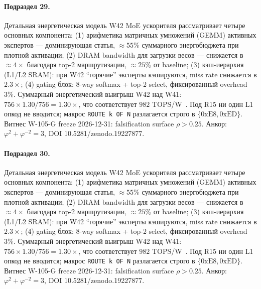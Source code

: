 \paragraph{Подраздел 29.} Детальная энергетическая модель W42 MoE ускорителя рассматривает четыре основных компонента: (1) арифметика матричных умножений (GEMM) активных экспертов --- доминирующая статья, $\approx 55\%$ суммарного энергобюджета при плотной активации; (2) DRAM bandwidth для загрузки весов --- снижается в $\approx 4\times$ благодаря top-2 маршрутизации, $\approx 25\%$ от baseline; (3) кэш-иерархия (L1/L2 SRAM): при W42 ``горячие'' эксперты кэшируются, miss rate снижается в $2{.}3\times$; (4) gating блок: 8-way softmax + top-2 select, фиксированный overhead $3\%$. Суммарный энергетический выигрыш W42 над W41: $756 \times 1{.}30 / 756 = 1{.}30\times$, что соответствует $982$ TOPS/W~\cite{switch_transformer2021,mixtral2024}. Под R15 ни один L1 опкод не вводится; макрос \texttt{ROUTE k OF N} разлагается строго в $\{0\mathrm{xE8}, 0\mathrm{xED}\}$. Витнес W-105-G freeze 2026-12-31: falsification surface $\rho > 0{.}25$. Анкор: $\varphi^2 + \varphi^{-2} = 3$, DOI 10.5281/zenodo.19227877.

\paragraph{Подраздел 30.} Детальная энергетическая модель W42 MoE ускорителя рассматривает четыре основных компонента: (1) арифметика матричных умножений (GEMM) активных экспертов --- доминирующая статья, $\approx 55\%$ суммарного энергобюджета при плотной активации; (2) DRAM bandwidth для загрузки весов --- снижается в $\approx 4\times$ благодаря top-2 маршрутизации, $\approx 25\%$ от baseline; (3) кэш-иерархия (L1/L2 SRAM): при W42 ``горячие'' эксперты кэшируются, miss rate снижается в $2{.}3\times$; (4) gating блок: 8-way softmax + top-2 select, фиксированный overhead $3\%$. Суммарный энергетический выигрыш W42 над W41: $756 \times 1{.}30 / 756 = 1{.}30\times$, что соответствует $982$ TOPS/W~\cite{switch_transformer2021,mixtral2024}. Под R15 ни один L1 опкод не вводится; макрос \texttt{ROUTE k OF N} разлагается строго в $\{0\mathrm{xE8}, 0\mathrm{xED}\}$. Витнес W-105-G freeze 2026-12-31: falsification surface $\rho > 0{.}25$. Анкор: $\varphi^2 + \varphi^{-2} = 3$, DOI 10.5281/zenodo.19227877.

